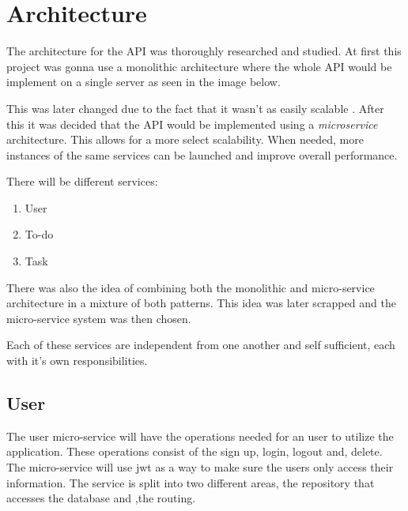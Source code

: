 \chapter{Architecture}

	
	
	
	The architecture for the API was thoroughly researched and studied. At first this project was gonna use a monolithic architecture \cite{monolith} where the whole API would be implement on a single server as seen in the image below.
	
	This was later changed due to the fact that it wasn't as easily scalable \cite{scale}. After this it was decided that the API would be implemented using a \textit{microservice}\cite{microservice} architecture. This allows for a more select scalability. When needed, more instances of the same services can be launched and improve overall performance.
	
	There will be different services:
	\begin{enumerate}
		\item User
		\item To-do
		\item Task
	\end{enumerate}

	
	There was also the idea of combining both the monolithic and micro-service architecture in a mixture of both patterns. This idea was later scrapped and the micro-service system was then chosen.
	
	
	Each of these services are independent from one another and self sufficient, each with it's own responsibilities. 
	
	
	
	\section{User}
	The user micro-service will have the operations needed for an user to utilize the application. These operations consist of the sign up, login, logout and, delete.
	The micro-service will use \gls{jwt} \cite{jwt} as a way to make sure the users only access their information.
	The service is split into two different areas, the repository\cite{repositorypattern} that accesses the database and ,the routing.
	
